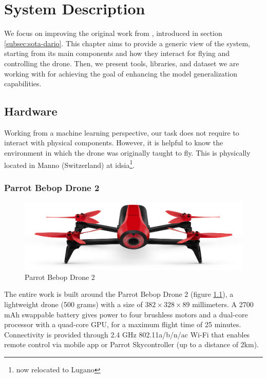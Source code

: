 \chapter{System Description}
\label{chap:system}


We focus on improving the original work from \cite{mantegazza2019visionbased}, introduced in section \ref{subsec:sota-dario}. This chapter aims to provide a generic view of the system, starting from its main components and how they interact for flying and controlling the drone. Then, we present tools, libraries, and dataset we are working with for achieving the goal of enhancing the model generalization capabilities.




\section{Hardware}
\label{sec:hardware}

Working from a machine learning perspective, our task does not require to interact with physical components. However, it is helpful to know the environment in which the drone was originally taught to fly. This is physically located in Manno (Switzerland) at \gls{idsia}\footnote{now relocated to Lugano}.



\subsection{Parrot Bebop Drone 2}
\label{subsec:bebop}

\begin{figure}[!htb]
	\centering
	\includegraphics[width=.8\textwidth]{"contents/images/03-Parrot-Bebop-2"}
	\caption[Parrot Bebop Drone 2]{Parrot Bebop Drone 2}
	\label{fig:bebop}
\end{figure}

The entire work is built around the Parrot Bebop Drone 2 (figure \ref{fig:bebop}), a lightweight drone (500 grams) with a size of $382 \times 328 \times 89$ millimeters. A 2700 mAh swappable battery gives power to four brushless motors and a dual-core processor with a quad-core GPU, for a maximum flight time of 25 minutes. Connectivity is provided through 2.4 GHz 802.11a/b/n/ac Wi-Fi that enables remote control via mobile app or Parrot Skycontroller (up to a distance of 2km).

